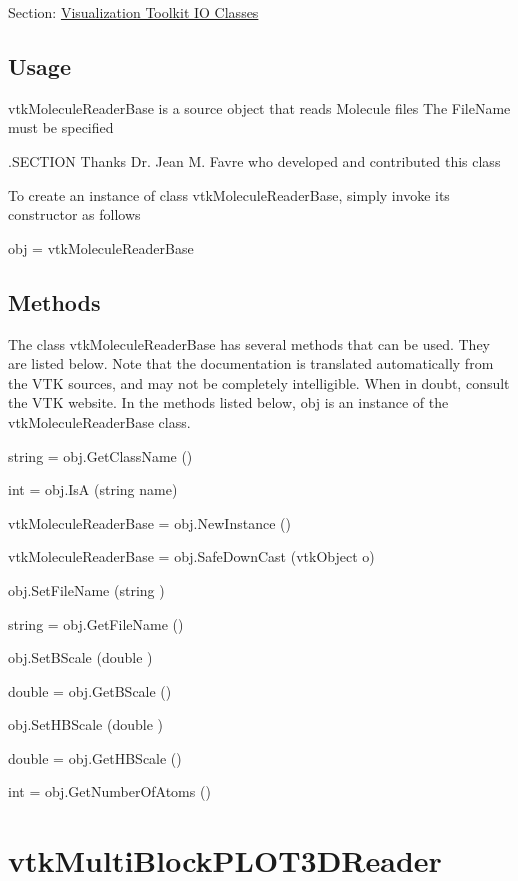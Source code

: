 Section\-: \hyperlink{sec_vtkio}{Visualization Toolkit I\-O Classes} \hypertarget{vtkwidgets_vtkxyplotwidget_Usage}{}\subsection{Usage}\label{vtkwidgets_vtkxyplotwidget_Usage}
vtk\-Molecule\-Reader\-Base is a source object that reads Molecule files The File\-Name must be specified

.S\-E\-C\-T\-I\-O\-N Thanks Dr. Jean M. Favre who developed and contributed this class

To create an instance of class vtk\-Molecule\-Reader\-Base, simply invoke its constructor as follows \begin{DoxyVerb}  obj = vtkMoleculeReaderBase
\end{DoxyVerb}
 \hypertarget{vtkwidgets_vtkxyplotwidget_Methods}{}\subsection{Methods}\label{vtkwidgets_vtkxyplotwidget_Methods}
The class vtk\-Molecule\-Reader\-Base has several methods that can be used. They are listed below. Note that the documentation is translated automatically from the V\-T\-K sources, and may not be completely intelligible. When in doubt, consult the V\-T\-K website. In the methods listed below, {\ttfamily obj} is an instance of the vtk\-Molecule\-Reader\-Base class. 
\begin{DoxyItemize}
\item {\ttfamily string = obj.\-Get\-Class\-Name ()}  
\item {\ttfamily int = obj.\-Is\-A (string name)}  
\item {\ttfamily vtk\-Molecule\-Reader\-Base = obj.\-New\-Instance ()}  
\item {\ttfamily vtk\-Molecule\-Reader\-Base = obj.\-Safe\-Down\-Cast (vtk\-Object o)}  
\item {\ttfamily obj.\-Set\-File\-Name (string )}  
\item {\ttfamily string = obj.\-Get\-File\-Name ()}  
\item {\ttfamily obj.\-Set\-B\-Scale (double )}  
\item {\ttfamily double = obj.\-Get\-B\-Scale ()}  
\item {\ttfamily obj.\-Set\-H\-B\-Scale (double )}  
\item {\ttfamily double = obj.\-Get\-H\-B\-Scale ()}  
\item {\ttfamily int = obj.\-Get\-Number\-Of\-Atoms ()}  
\end{DoxyItemize}\hypertarget{vtkio_vtkmultiblockplot3dreader}{}\section{vtk\-Multi\-Block\-P\-L\-O\-T3\-D\-Reader}\label{vtkio_vtkmultiblockplot3dreader}
